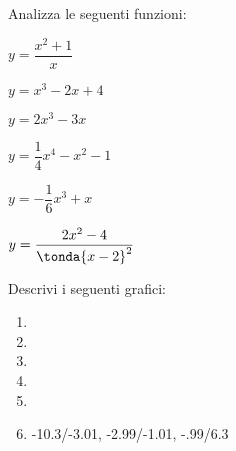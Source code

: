 \begin{esercizio}\label{ese:stufun.1e}
Analizza le seguenti funzioni:
\begin{multicols}{3}
 \begin{enumeratea}
  \item \(y = \dfrac{x^2 +1}{x}\) \\ %
  \item \(y = x^3-2x+4\) %
  \item \(y = 2x^3-3x\) \\ %
  \item \(y = \dfrac{1}{4}x^4-x^2-1\) %
  \item \(y = -\dfrac{1}{6}x^3+x\) \\ %
  \item \(y = \dfrac{2x^2-4}{\tonda{x-2}^2}\) %
 \end{enumeratea}
\end{multicols}
\end{esercizio}

\begin{esercizio}\label{ese:stufun.2g}
Descrivi i seguenti grafici:

\begin{multicols}{2}
\begin{enumerate} [left=0pt, label=\alph*)]
\item \myp 
{} %
\item \myp 
{}%
\item \myp 
{}%
\item \myp 
{} %
\item \myp 
{} %
\item \myp 
{} 
{-10.3/-3.01, -2.99/-1.01, -.99/6.3}%
\end{enumerate}
\end{multicols}
\end{esercizio}

